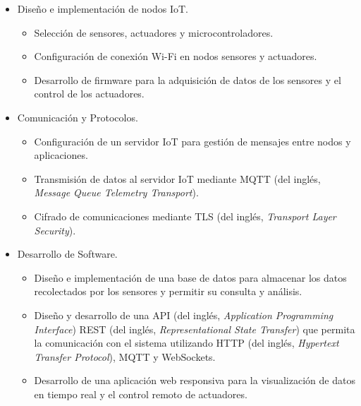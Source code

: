 \begin{itemize}
      \item Diseño e implementación de nodos IoT.
            \begin{itemize}
                  \item Selección de sensores, actuadores y microcontroladores.
                  \item Configuración de conexión Wi-Fi en nodos sensores y actuadores.
                  \item Desarrollo de firmware para la adquisición de datos de los sensores y el
                        control de los actuadores.
            \end{itemize}
\end{itemize}
\begin{itemize}
      \item Comunicación y Protocolos.
            \begin{itemize}
                  \item Configuración de un servidor IoT para gestión de mensajes entre nodos y
                        aplicaciones.
                  \item Transmisión de datos al servidor IoT mediante MQTT (del inglés, \textit{Message Queue
                              Telemetry Transport}).
                  \item Cifrado de comunicaciones mediante TLS (del inglés, \textit{Transport Layer Security}).
            \end{itemize}
\end{itemize}
\begin{itemize}
      \item Desarrollo de Software.
            \begin{itemize}
                  \item Diseño e implementación de una base de datos para almacenar los datos
                        recolectados por los sensores y permitir su consulta y análisis.
                  \item Diseño y desarrollo de una API (del inglés, \textit{Application Programming Interface})
                        REST (del inglés, \textit{Representational State Transfer}) que permita la comunicación con
                        el sistema utilizando HTTP (del inglés, \textit{Hypertext Transfer Protocol}), MQTT y
                        WebSockets.
                  \item Desarrollo de una aplicación web responsiva para la visualización de datos en
                        tiempo real y el control remoto de actuadores.
            \end{itemize}
\end{itemize}
